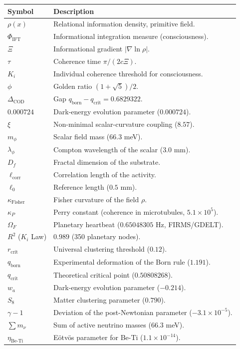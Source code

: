 \documentclass[12pt, a4paper]{article}
\theoremstyle{miuThm}
\theoremstyle{remark}
\newcommand{\eps}{0.000724}
\newcommand{\Rtwo}{0.989}
\begin{document}
\begin{longtable}{lp{10cm}}
\toprule
\textbf{Symbol} & \textbf{Description} \\
\midrule
$\rho(x)$ & Relational information density, primitive field. \\
$\Phi_{\text{IFT}}$ & Informational integration measure (consciousness). \\
$\Xi$ & Informational gradient $|\nabla\ln\rho|$. \\
$\tau$ & Coherence time $\pi/(2c\Xi)$. \\
$K_i$ & Individual coherence threshold for consciousness. \\
$\phi$ & Golden ratio $(1+\sqrt5)/2$. \\
$\Delta_{\text{COD}}$ & Gap $q_{\text{born}} - q_{\text{crit}} = 0.6829322$. \\
$\eps$ & Dark-energy evolution parameter ($0.000724$). \\
$\xi$ & Non-minimal scalar-curvature coupling ($8.57$). \\
$m_\phi$ & Scalar field mass ($66.3$ meV). \\
$\lambda_\phi$ & Compton wavelength of the scalar ($3.0$ mm). \\
$D_f$ & Fractal dimension of the substrate. \\
$\ell_{\text{corr}}$ & Correlation length of the activity. \\
$\ell_0$ & Reference length ($0.5$ mm). \\
$\kappa_{\text{Fisher}}$ & Fisher curvature of the field $\rho$. \\
$\kappa_P$ & Perry constant (coherence in microtubules, $5.1\times10^5$). \\
$\Omega_F$ & Planetary heartbeat ($0.65048305$ Hz, FIRMS/GDELT). \\
$R^2$ ($K_i$ Law) & $\Rtwo$ (350 planetary nodes). \\
$r_{\text{crit}}$ & Universal clustering threshold ($0.12$). \\
$q_{\text{born}}$ & Experimental deformation of the Born rule ($1.191$). \\
$q_{\text{crit}}$ & Theoretical critical point ($0.50808268$). \\
$w_a$ & Dark-energy evolution parameter ($-0.214$). \\
$S_8$ & Matter clustering parameter ($0.790$). \\
$\gamma-1$ & Deviation of the post-Newtonian parameter ($-3.1\times10^{-5}$). \\
$\sum m_\nu$ & Sum of active neutrino masses ($66.3$ meV). \\
$\eta_{\text{Be-Ti}}$ & Eötvös parameter for Be-Ti ($1.1\times10^{-14}$). \\
\bottomrule
\end{longtable}
\end{document}
